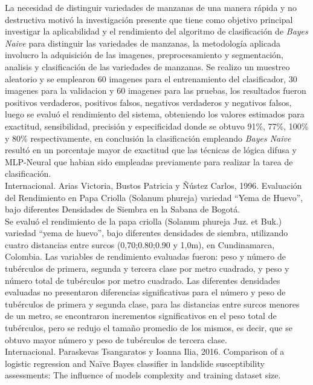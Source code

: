 La necesidad de distinguir variedades de manzanas de una manera rápida y no destructiva motivó la investigación presente que tiene como objetivo principal investigar la aplicabilidad y el rendimiento del algoritmo de clasificación de \textit{Bayes Naive} para distinguir las variedades de manzanas, la metodología aplicada involucro la adquisición de las imagenes, preprocesamiento y segmentación, analisis y clasificación de las variedades de manzanas. Se realizo un muestreo aleatorio y se emplearon 60 imagenes para el entrenamiento del clasificador, 30 imagenes para la validacion y 60 imagenes para las pruebas, los resultados fueron positivos verdaderos, positivos falsos, negativos verdaderos y negativos falsos, luego se evaluó el rendimiento del sistema, obteniendo los valores estimados para exactitud, sensibilidad, precisión y especificidad donde se obtuvo 91\%, 77\%, 100\% y 80\% respectivamente, en conclusión la clasificación empleando \textit{Bayes Naive} resultó en un porcentaje mayor de exactitud que las técnicas de lógica difusa y MLP-Neural que habian sido empleadas previamente para realizar la tarea de clasificación.\\

Internacional. Arias Victoria, Bustos Patricia y Ñústez Carlos, 1996. Evaluación del Rendimiento en Papa Criolla (Solanum phureja) variedad "`Yema de Huevo"', bajo diferentes Densidades de Siembra en la Sabana de Bogotá.\\

Se evaluó el rendimiento de la papa criolla (Solanum phureja Juz. et Buk.) variedad "`yema de huevo"', bajo diferentes densidades de siembra, utilizando cuatro distancias entre surcos (0,70;0.80;0.90 y 1,0m), en Cundinamarca, Colombia. Las variables de rendimiento evaluadas fueron: peso y número de tubérculos de primera, segunda y tercera clase por metro cuadrado, y peso y número total de tubérculos por metro cuadrado. Las diferentes densidades evaluadas no presentaron diferencias significativas para el número y peso de tubérculos de primera y segunda clase, para las distancias entre surcos menores de un metro, se encontraron incrementos significativos en el peso total de tubérculos, pero se redujo el tamaño promedio de los mismos, es decir, que se obtuvo mayor número y peso de tubérculos de tercera clase.\\ 

Internacional. Paraskevas Tsangaratos y Ioanna Ilia, 2016. Comparison of a logistic regression and Naïve Bayes classifier in landslide susceptibility assessments: The influence of models complexity and training dataset size.\\ 

